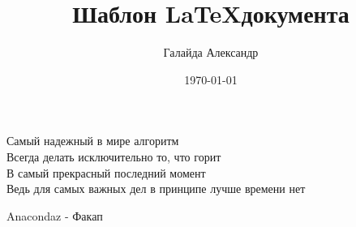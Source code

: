\documentclass[a4paper,10pt]{article}
\title{Шаблон \LaTeX документа}
\author{Галайда Александр}
\date{\today}
\begin{document}
\maketitle
\epigraph{Самый надежный в мире алгоритм \\
	Всегда делать исключительно то, что горит \\
	В самый прекрасный последний момент \\
	Ведь для самых важных дел в принципе лучше времени нет}{Anacondaz - Факап}
\tableofcontents

\clearpage
\printglossaries
\printbibliography
\end{document}
